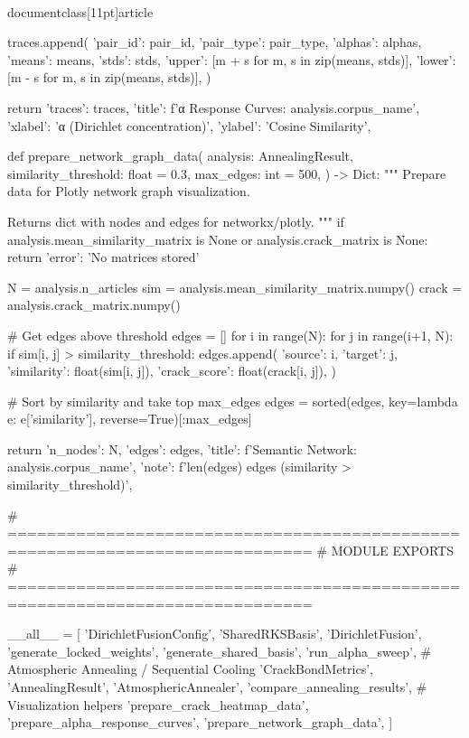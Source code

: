 \\documentclass[11pt]{article}
\begin{document}
\begin{CodeBlock}
{{{{{{{{{{        traces.append({
            'pair_id': pair_id,
            'pair_type': pair_type,
            'alphas': alphas,
            'means': means,
            'stds': stds,
            'upper': [m + s for m, s in zip(means, stds)],
            'lower': [m - s for m, s in zip(means, stds)],
        })
    
    return {
        'traces': traces,
        'title': f'α Response Curves: {analysis.corpus_name}',
        'xlabel': 'α (Dirichlet concentration)',
        'ylabel': 'Cosine Similarity',
    }


def prepare_network_graph_data(
    analysis: AnnealingResult,
    similarity_threshold: float = 0.3,
    max_edges: int = 500,
) -> Dict:
    """
    Prepare data for Plotly network graph visualization.
    
    Returns dict with nodes and edges for networkx/plotly.
    """
    if analysis.mean_similarity_matrix is None or analysis.crack_matrix is None:
        return {'error': 'No matrices stored'}
    
    N = analysis.n_articles
    sim = analysis.mean_similarity_matrix.numpy()
    crack = analysis.crack_matrix.numpy()
    
    # Get edges above threshold
    edges = []
    for i in range(N):
        for j in range(i+1, N):
            if sim[i, j] > similarity_threshold:
                edges.append({
                    'source': i,
                    'target': j,
                    'similarity': float(sim[i, j]),
                    'crack_score': float(crack[i, j]),
                })
    
    # Sort by similarity and take top max_edges
    edges = sorted(edges, key=lambda e: e['similarity'], reverse=True)[:max_edges]
    
    return {
        'n_nodes': N,
        'edges': edges,
        'title': f'Semantic Network: {analysis.corpus_name}',
        'note': f'{len(edges)} edges (similarity > {similarity_threshold})',
    }


# =============================================================================
# MODULE EXPORTS
# =============================================================================

__all__ = [
    'DirichletFusionConfig',
    'SharedRKSBasis',
    'DirichletFusion',
    'generate_locked_weights',
    'generate_shared_basis',
    'run_alpha_sweep',
    # Atmospheric Annealing / Sequential Cooling
    'CrackBondMetrics',
    'AnnealingResult',
    'AtmosphericAnnealer',
    'compare_annealing_results',
    # Visualization helpers
    'prepare_crack_heatmap_data',
    'prepare_alpha_response_curves',
    'prepare_network_graph_data',
]


}}}}}}}}}}
\end{CodeBlock}
\end{document}
